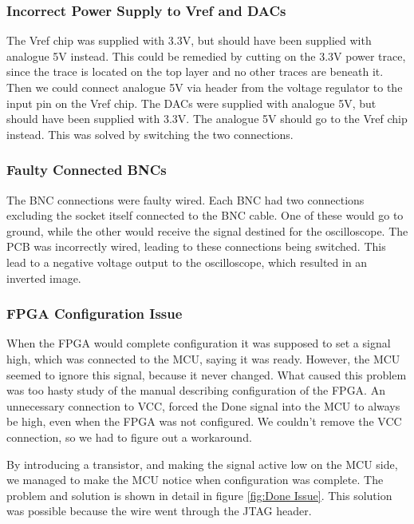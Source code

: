 \subsubsection{Incorrect Power Supply to Vref and DACs}
The Vref chip was supplied with 3.3V, but should have been supplied with analogue 5V instead. This could be remedied by cutting on the 3.3V power trace, since the trace is located on the top layer and no other traces are beneath it. Then we could connect analogue 5V via header from the voltage regulator to the input pin on the Vref chip.
\newline
The DACs were supplied with analogue 5V, but should have been supplied with 3.3V. The analogue 5V should go to the Vref chip instead. This was solved by switching the two connections.

\subsubsection{Faulty Connected BNCs}
The BNC connections were faulty wired. Each BNC had two connections excluding the socket itself connected to the BNC cable. One of these would go to ground, while the other would receive the signal destined for the oscilloscope. The PCB was incorrectly wired, leading to these connections being switched. This lead to a negative voltage output to the oscilloscope, which resulted in an inverted image. 

\subsubsection{FPGA Configuration Issue}
When the FPGA would complete configuration it was supposed to set a signal high, which was connected to the MCU, saying it was ready. However, the MCU seemed to ignore this signal, because it never changed. What caused this problem was too hasty study of the manual describing configuration of the FPGA.
An unnecessary connection to VCC, forced the Done signal into the MCU to always be high, even when the FPGA was not configured. We couldn't remove the VCC connection, so we had to figure out a workaround.

By introducing a transistor, and making the signal active low on the MCU side, we managed to make the MCU notice when configuration was complete.
The problem and solution is shown in detail in figure \ref{fig:Done Issue}.
This solution was possible because the wire went through the JTAG header. 

